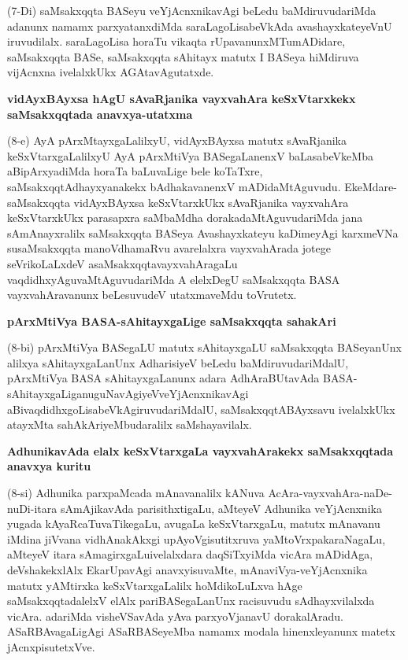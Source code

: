 (7-Di) saMsakxqqta BASeyu veYjAcnxnikavAgi beLedu baMdiruvudariMda adanunx namamx parxyatanxdiMda saraLagoLisabeVkAda avashayxkateyeVnU  iruvudilalx. saraLagoLisa horaTu vikaqta rUpavanunxMTumADi\-dare, saMsakxqqta BASe, saMsakxqqta sAhitayx matutx I BASeya hiMdiruva vijAcnxna ivelalxkUkx AGAtavAgutatxde.

{\medskip
\noindent
{\large\bf vidAyxBAyxsa hAgU sAvaRjanika vayxvahAra keSxVtarxkekx saMsakxqqtada anavxya-\break\-utatxma}}\label{page36}
\smallskip

\noindent
(8-e) AyA pArxMtayxgaLalilxyU, vidAyxBAyxsa matutx sAvaRjanika keSxVtarxgaLalilxyU AyA pArxM\-tiVya BASegaLanenxV baLasabeVkeMba aBipArxyadiMda horaTa baLuvaLige bele koTaTxre, saMsakxqqtAdhayxya\-nakekx bAdhaka\-vanenxV mADidaMtAguvudu. EkeMdare-saMsakxqqta vidAyxBAyxsa keSxVtarxkUkx sAvaRjanika vayxva\-hAra keSxVtarxkUkx parasapxra saMbaMdha dorakadaMtAguvudariMda jana sAmAnayxralilx saMsakxqqta BASeya Avashayx\-kateyu kaDime\-yAgi karxmeVNa susaMsakxqqta manoVdhamaRvu avarelalxra vayxvahArada jotege seVrikoLaLxdeV asaM\-sakxqqta\-vayxvahAragaLu vaqdidhxyAguvaMtAguvudariMda A elelxDegU saMsakxqqta BASA vayxvahAravanunx beLesu\-vudeV utatxmaveMdu toVrutetx.

{\bigskip
\noindent
{\large\bf pArxMtiVya BASA-sAhitayxgaLige saMsakxqqta sahakAri}}\label{page36}
\medskip

\noindent
(8-bi) pArxMtiVya BASegaLU matutx sAhitayxgaLU saMsakxqqta BASeyanUnx alilxya sAhitayx\-gaLanUnx Adha\-risiyeV beLedu baMdiruvudariMdalU, pArxMtiVya BASA sAhitayxgaLanunx adara AdhAraBUta\-vAda BASA-sAhitayxgaLiganuguNavAgiyeV\break veYjAcnx\-nikavAgi aBivaqdidhxgoLisabeVkAgiruvuda\-riMdalU, saMsakxqqtA\-BAyxsavu ivelalxkUkx atayxMta sahAkAriyeMbudaralilx saMshayavilalx.

{\bigskip
\noindent
{\large\bf AdhunikavAda elalx keSxVtarxgaLa vayxvahArakekx saMsakxqqtada anavxya kuritu}}\label{page36}
\medskip

\noindent
(8-si) Adhunika parxpaMcada mAnavanalilx kANuva AcAra-vayxvahAra-naDe-nuDi-\-itara sAmAjika\-vAda parisithxtigaLu, aMteyeV Adhunika veYjAcnxnika yugada kAyaR\-caTuvaTikegaLu, avugaLa keSxVtarxgaLu, matutx mAnavanu iMdina jiVvana vidhAnakAkxgi upAyoVgisutitxruva yaMtoVrxpakaraNagaLu, aMteyeV itara sAmagirxgaLu\break ivelalxdara daqSiTxyiMda vicAra mADidAga, deVshakekxlAlx EkarUpavAgi anavxyisu\-vaMte, mAna\-viVya-veYjAcnxnika matutx yAMtirxka keSxVtarxgaLalilx hoMdikoLuLxva hAge saMsakxqqtadalelxV elAlx pariBASe\-gaLanUnx racisuvudu sAdhayxvilalxda vicAra. adariMda visheVSavAda yAva parxyoVjanavU dorakalAradu. ASaR\-BAvagaLigAgi ASaR\-BASeyeMba namamx modala hinenxleyanunx matetx jAcnxpisutetxVve.

